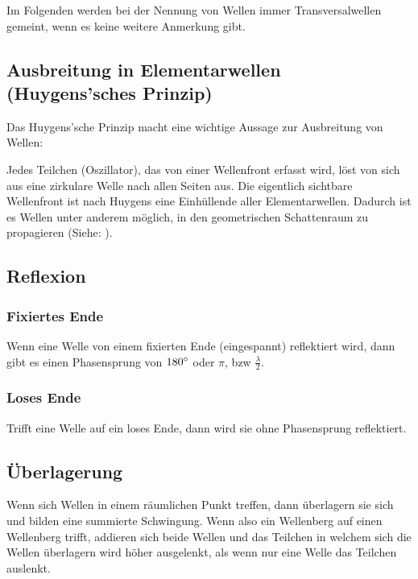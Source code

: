 Im Folgenden werden bei der Nennung von \glqq Wellen\grqq{} immer Transversalwellen gemeint, wenn es keine weitere Anmerkung gibt.  


\subsection[Ausbreitung in Elementarwellen]{Ausbreitung in Elementarwellen (Huygens'sches Prinzip)} \label{subsec:ausbreitung}

Das Huygens'sche Prinzip macht eine wichtige Aussage zur Ausbreitung von Wellen:

\glqq Jedes Teilchen (Oszillator), das von einer Wellenfront erfasst wird, löst von sich aus eine zirkulare Welle nach allen Seiten aus.\grqq{} Die eigentlich sichtbare Wellenfront ist nach Huygens eine Einhüllende aller \glqq Elementarwellen\grqq . Dadurch ist es Wellen unter anderem möglich, in den geometrischen Schattenraum zu propagieren (Siehe: ).


\subsection{Reflexion}  \label{subsec:Reflexion}

	\subsubsection{Fixiertes Ende}
	
	Wenn eine Welle von einem fixierten Ende (eingespannt) reflektiert wird, dann gibt es einen Phasensprung von $180 \degree$ oder $\pi$, bzw $\frac{\lambda}{2}$.
	
	\subsubsection{Loses Ende}
	
	Trifft eine Welle auf ein loses Ende, dann wird sie ohne Phasensprung reflektiert.



\subsection{Überlagerung} \label{subsec:ueberlagerung}

Wenn sich Wellen in einem räumlichen Punkt treffen, dann überlagern sie sich und bilden eine summierte Schwingung. Wenn also ein Wellenberg auf einen Wellenberg trifft, addieren sich beide Wellen und das Teilchen in welchem sich die Wellen überlagern wird höher ausgelenkt, als wenn nur eine Welle das Teilchen auslenkt.

